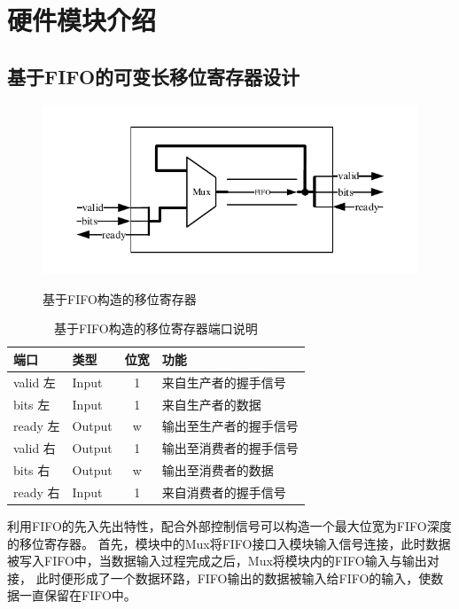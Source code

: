 \chapter{硬件模块介绍}

\section{基于FIFO的可变长移位寄存器设计}
\begin{figure}[h]
    \centering
    \includegraphics{../pdf/fifoshift.pdf}\\
    \caption{基于FIFO构造的移位寄存器}
\end{figure}
\begin{table}[h] %
    \centering
    \caption{基于FIFO构造的移位寄存器端口说明} %
    \begin{tabular}{l|l|c|l} %
    \hline  
    \hline  
    端口 & 类型 & 位宽 & 功能 \\ %
    \hline %
    valid 左 & Input & 1 & 来自生产者的握手信号 \\  
    \hline  
    bits 左 & Input & 1 & 来自生产者的数据 \\  
    \hline  
    ready 左 & Output & w &输出至生产者的握手信号 \\  
    \hline  
    valid 右 & Output & 1 & 输出至消费者的握手信号 \\  
    \hline  
    bits 右 & Output & w & 输出至消费者的数据 \\  
    \hline  
    ready 右 & Input & 1 & 来自消费者的握手信号\\  
    \hline  
    \hline  
    \end{tabular}  
\end{table}  
利用FIFO的先入先出特性，配合外部控制信号可以构造一个最大位宽为FIFO深度的移位寄存器。
首先，模块中的Mux将FIFO接口入模块输入信号连接，此时数据被写入FIFO中，当数据输入过程完成之后，Mux将模块内的FIFO输入与输出对接，
此时便形成了一个数据环路，FIFO输出的数据被输入给FIFO的输入，使数据一直保留在FIFO中。


